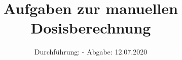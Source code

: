 

\subject{TPS Praktikum}
\title{Aufgaben zur manuellen Dosisberechnung}
\date{%
	Durchführung: -
	\hspace{3em}
	Abgabe: 12.07.2020
}



	\maketitle
	\thispagestyle{empty}
	\tableofcontents
	\newpage
	\setlength{\parindent}{0em}

	
	


